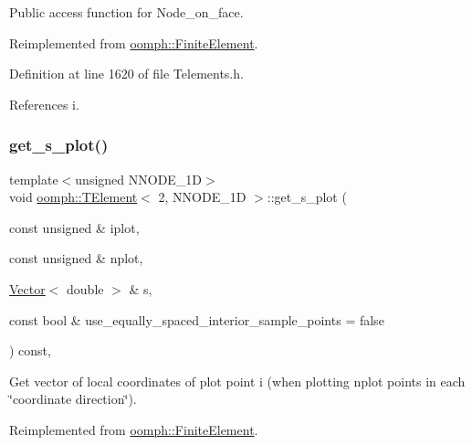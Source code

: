 Public access function for Node\+\_\+on\+\_\+face. 



Reimplemented from \hyperlink{classoomph_1_1FiniteElement_a2cd0ee849adf50dae1a70a20fab47119}{oomph\+::\+Finite\+Element}.



Definition at line 1620 of file Telements.\+h.



References i.

\mbox{\label{classoomph_1_1TElement_3_012_00_01NNODE__1D_01_4_a9276c0c42a0e98f0e72719f510a83bc8}} 
\subsubsection{\texorpdfstring{get\+\_\+s\+\_\+plot()}{get\_s\_plot()}}
{\footnotesize\ttfamily template$<$unsigned N\+N\+O\+D\+E\+\_\+1D$>$ \\
void \hyperlink{classoomph_1_1TElement}{oomph\+::\+T\+Element}$<$ 2, N\+N\+O\+D\+E\+\_\+1D $>$\+::get\+\_\+s\+\_\+plot (\begin{DoxyParamCaption}\item[{const unsigned \&}]{iplot,  }\item[{const unsigned \&}]{nplot,  }\item[{\hyperlink{classoomph_1_1Vector}{Vector}$<$ double $>$ \&}]{s,  }\item[{const bool \&}]{use\+\_\+equally\+\_\+spaced\+\_\+interior\+\_\+sample\+\_\+points = {\ttfamily false} }\end{DoxyParamCaption}) const\hspace{0.3cm}{\ttfamily [inline]}, {\ttfamily [virtual]}}



Get vector of local coordinates of plot point i (when plotting nplot points in each \char`\"{}coordinate direction\char`\"{}). 



Reimplemented from \hyperlink{classoomph_1_1FiniteElement_a82da844fd3ebb2005842464cdc148a03}{oomph\+::\+Finite\+Element}.




